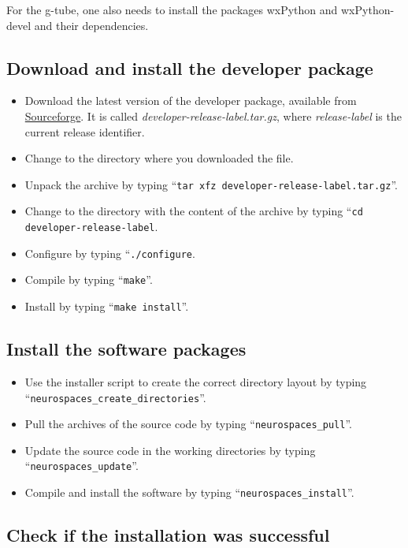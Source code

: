 \documentclass[12pt]{article}
\begin{document}
 For the g-tube, one also needs to install the packages wxPython and
 wxPython-devel and their dependencies.
 
\subsection*{Download and install the developer package}

\begin{itemize}
   \item[] Download the latest version of the developer package, available from \href{http://sourceforge.net/projects/neurospaces/files/}{Sourceforge}. It is called {\it developer-release-label.tar.gz}, where {\it release-label} is the current release identifier.
   \item[] Change to the directory where you downloaded the file.
   \item[] Unpack the archive by typing ``{\tt tar xfz developer-release-label.tar.gz}''.
   \item[] Change to the directory with the content of the archive by typing ``{\tt cd developer-release-label}.
   \item[] Configure by typing ``{\tt ./configure}.
   \item[] Compile by typing ``{\tt make}''.
   \item[] Install by typing ``{\tt make install}''. 
\end{itemize}

\subsection*{Install the software packages}

\begin{itemize}
   \item[] Use the installer script to create the correct directory layout by typing ``{\tt neurospaces\_create\_directories}''.
   \item[] Pull the archives of the source code by typing ``{\tt neurospaces\_pull}''.
   \item[] Update the source code in the working directories by typing ``{\tt neurospaces\_update}''.
   \item[] Compile and install the software by typing ``{\tt neurospaces\_install}''.
\end{itemize}

\subsection*{Check if the installation was successful}
\end{document}
